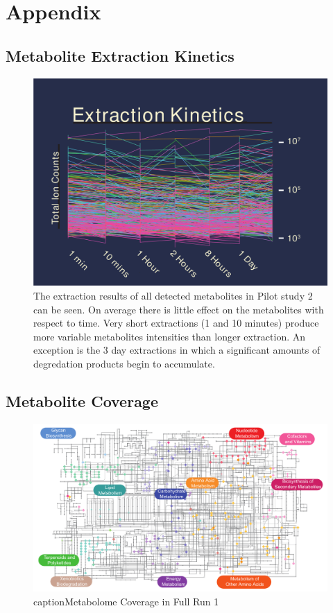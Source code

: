 \documentclass[a4paper,11pt,twoside]{book}
\begin{document}
\chapter{Appendix}
\begin{subappendices}

	\section{Metabolite Extraction Kinetics}
\begin{figure}[hbt!]
	\includegraphics[width=\linewidth]{Appendix_FIgures/Extraction_Kinetics_1.pdf}
	\caption{The extraction results of all detected metabolites in Pilot study 2 can be seen. On average there is little effect on the metabolites with respect to time. Very short extractions (1 and 10 minutes) produce more variable metabolites intensities than longer extraction. An exception is the 3 day extractions in which a significant amounts of degredation products begin to accumulate.}
	\label{appendix: Extraction Kinetics Traces}
\end{figure}

\clearpage

\section{Metabolite Coverage}
\begin{figure}[bht!]
	\includegraphics[width=\linewidth]{3.Metabolomics/Coverage.pdf}
	caption{Metabolome Coverage in Full Run 1}
	\label{appendix:Metabolome Coverage}


\end{figure}
\end{subappendices}
\end{document}
